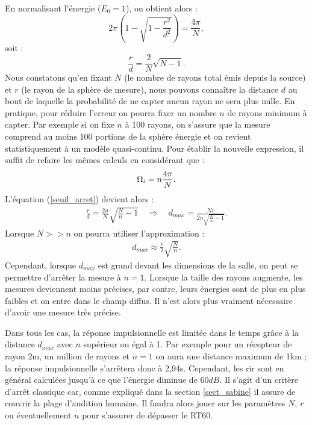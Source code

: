 %
En normalisant l'énergie ($E_0 = 1$), on obtient alors :
%
\begin{equation*} 
	2\pi \left(1-\sqrt{1-\frac{r^2}{d^2}} \right) = \frac{4\pi}{N},	
\end{equation*}
soit :
\begin{equation} \label{seuil_arret}
	 \frac{r}{d} =  \frac{2}{N} \sqrt{N-1}. 
\end{equation}
%
Nous constatons qu'en fixant $N$ (le nombre de rayons total émis depuis la source) et $r$ (le rayon de la sphère de mesure), nous pouvons connaître la distance $d$ au bout de laquelle la probabilité de ne capter aucun rayon ne sera plus nulle. En pratique, pour réduire l'erreur on pourra fixer un nombre $n$ de rayons minimum à capter. Par exemple si on fixe $n$ à 100 rayons, on s'assure que la mesure comprend au moins 100 portions de la sphère énergie et on revient statistiquement à un modèle quasi-continu. Pour établir la nouvelle expression, il suffit de refaire les mêmes calculs en considérant que :
\begin{equation}
	\Omega_i = n\frac{4\pi}{N}. \\
\end{equation}
%
L'équation (\ref{seuil_arret}) devient alors :
\begin{align} 
	\frac{r}{d} =  \frac{2n}{N} \sqrt{\frac{N}{n}-1} %
 	\quad \Rightarrow  \quad %
	 d_{max} =  \frac{Nr}{2n\sqrt{\frac{N}{n}-1}}.
\end{align}
%
Lorsque $N >> n$ on pourra utiliser l'approximation : 
\begin{align} \label{eq_dmax}
	 d_{max} \approx  \frac{r}{2} \sqrt{\frac{N}{n}}.
\end{align}
Cependant, lorsque $d_{max}$ est grand devant les dimensions de la salle, on peut se permettre d'arrêter la mesure à $n=1$. Lorsque la taille des rayons augmente, les mesures deviennent moins précises, par contre, leurs énergies sont de plus en plus faibles et on entre dans le champ diffus. Il n'est alors plus vraiment nécessaire d'avoir une mesure très précise. 

Dans tous les cas, la réponse impulsionnelle est limitée dans le temps grâce à la distance $d_{max}$ avec $n$ supérieur ou égal à 1. Par exemple pour un récepteur de rayon 2m, un million de rayons et $n=1$ on aura une distance maximum de 1km ; la réponse impulsionnelle s'arrêtera donc à 2,94s. Cependant, les \gls{rir} sont en général calculées jusqu'à ce que l'énergie diminue de $60dB$. Il s'agit d'un critère d'arrêt classique car, comme expliqué dans la section \ref{sect_sabine} il assure de couvrir la plage d'audition humaine. Il faudra alors jouer sur les paramètres $N$, $r$ ou éventuellement $n$ pour s'assurer de dépasser le \gls{RT60}. 

